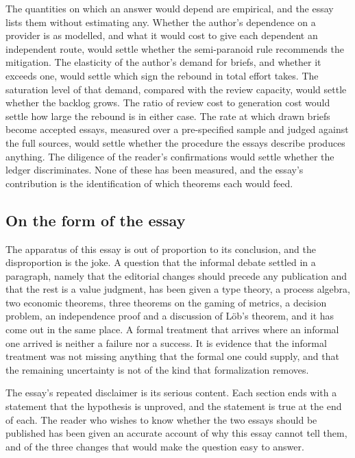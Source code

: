 \documentclass[11pt]{article}
\theoremstyle{plain}
\theoremstyle{definition}
\theoremstyle{remark}
\begin{document}
The quantities on which an answer would depend are empirical, and the essay lists them without estimating any. Whether the author's dependence on a provider is as modelled, and what it would cost to give each dependent an independent route, would settle whether the semi-paranoid rule recommends the mitigation. The elasticity of the author's demand for briefs, and whether it exceeds one, would settle which sign the rebound in total effort takes. The saturation level of that demand, compared with the review capacity, would settle whether the backlog grows. The ratio of review cost to generation cost would settle how large the rebound is in either case. The rate at which drawn briefs become accepted essays, measured over a pre-specified sample and judged against the full sources, would settle whether the procedure the essays describe produces anything. The diligence of the reader's confirmations would settle whether the ledger discriminates. None of these has been measured, and the essay's contribution is the identification of which theorems each would feed.

\subsection{On the form of the essay}

The apparatus of this essay is out of proportion to its conclusion, and the disproportion is the joke. A question that the informal debate settled in a paragraph, namely that the editorial changes should precede any publication and that the rest is a value judgment, has been given a type theory, a process algebra, two economic theorems, three theorems on the gaming of metrics, a decision problem, an independence proof and a discussion of Löb's theorem, and it has come out in the same place. A formal treatment that arrives where an informal one arrived is neither a failure nor a success. It is evidence that the informal treatment was not missing anything that the formal one could supply, and that the remaining uncertainty is not of the kind that formalization removes.

The essay's repeated disclaimer is its serious content. Each section ends with a statement that the hypothesis is unproved, and the statement is true at the end of each. The reader who wishes to know whether the two essays should be published has been given an accurate account of why this essay cannot tell them, and of the three changes that would make the question easy to answer.
\end{document}
